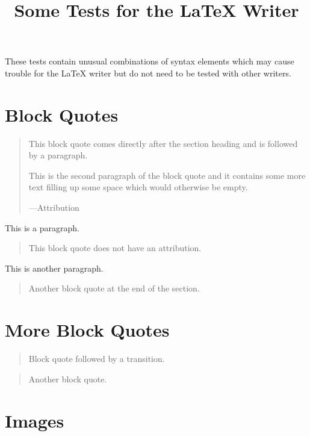 \documentclass[a4paper]{article}
\title{\phantomsection%
  Some Tests for the LaTeX Writer%
  \label{some-tests-for-the-latex-writer}}
\author{}
\date{}
\providecommand*{\DUtransition}{%
  \hspace*{\fill}\hrulefill\hspace*{\fill}
  \vskip 0.5\baselineskip
}
\begin{document}
\maketitle

These tests contain unusual combinations of syntax elements which may cause
trouble for the LaTeX writer but do not need to be tested with other writers.


\section{Block Quotes%
  \label{block-quotes}%
}

\begin{quote}
This block quote comes directly after the section heading and is
followed by a paragraph.

This is the second paragraph of the block quote and it contains
some more text filling up some space which would otherwise be
empty.
\nopagebreak

\raggedleft —Attribution
\end{quote}

This is a paragraph.

\begin{quote}
This block quote does not have an attribution.
\end{quote}

This is another paragraph.

\begin{quote}
Another block quote at the end of the section.
\end{quote}


\section{More Block Quotes%
  \label{more-block-quotes}%
}

\begin{quote}
Block quote followed by a transition.
\end{quote}

\DUtransition

\begin{quote}
Another block quote.
\end{quote}


\section{Images%
  \label{images}%
}
\end{document}
